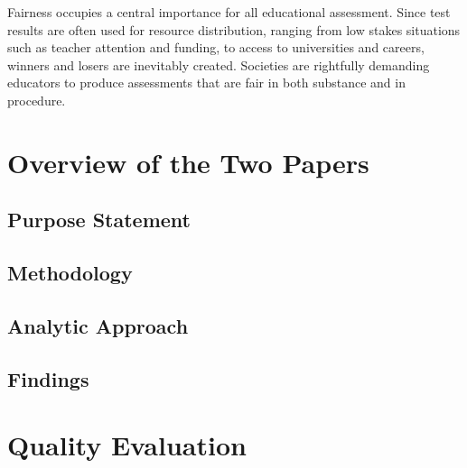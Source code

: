 \documentclass[
    a4paper,            %
    12pt,               %
    stu,                %
    noextraspace,       %
    floatsintext,       %
    biblatex,           %
    colorlinks=true,        %
    linkcolor=red,          %
    anchorcolor=black,      %
    citecolor=blue,         %
    urlcolor=blue,          %
    bookmarks=true,         %
    bookmarksopen=false,    %
    bookmarksnumbered=true  %
]{apa7}
\begin{document}
Fairness occupies a central importance for all educational assessment. Since test results are often used for resource distribution, ranging from low stakes situations such as teacher attention and funding, to access to universities and careers, winners and losers are inevitably created. Societies are rightfully demanding educators to produce assessments that are fair in both substance and in procedure.

\section{Overview of the Two Papers}

\subsection{Purpose Statement}

\subsection{Methodology}

\subsection{Analytic Approach}

\subsection{Findings}

\section{Quality Evaluation}

\printbibliography
\end{document}
